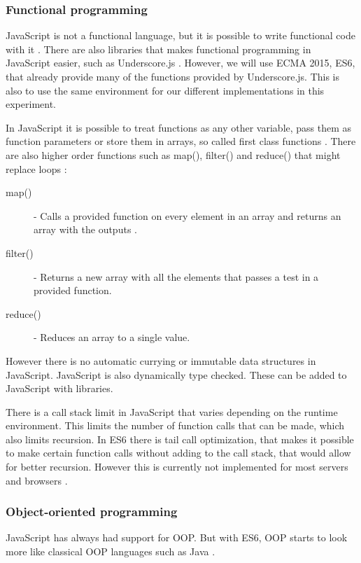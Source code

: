 \documentclass {article}
\begin{document}
\subsubsection{Functional programming}
\label{sec:js-fp}
JavaScript is not a functional language, but it is possible to write functional code with it \cite{drboolean}. There are also libraries that makes functional programming in JavaScript easier, such as Underscore.js \cite{underscorejs} \cite{fogus}. However, we will use ECMA 2015, ES6, that already provide many of the functions provided by Underscore.js. This is also to use the same environment for our different implementations in this experiment.

In JavaScript it is possible to treat functions as any other variable, pass them as function parameters or store them in arrays, so called first class functions \cite{drboolean}. There are also higher order functions such as map(), filter() and reduce() that might replace loops \cite{grady}:

\begin{description}
\item [map()] - Calls a provided function on every element in an array and returns an array with the outputs \cite{jsref}.
\item [filter()] - Returns a new array with all the elements that passes a test in a provided function. 
\item [reduce()] - Reduces an array to a single value.
\end{description}

However there is no automatic currying or immutable data structures in JavaScript. JavaScript is also dynamically type checked. These can be added to JavaScript with libraries.

There is a call stack limit in JavaScript that varies depending on the runtime environment. This limits the number of function calls that can be made, which also limits recursion. In ES6 there is tail call optimization, that makes it possible to make certain function calls without adding to the call stack, that would allow for better recursion. However this is currently not implemented for most servers and browsers \cite{ecma6table}.
\subsubsection{Object-oriented programming}
JavaScript has always had support for OOP. But 
with ES6, OOP starts to look more like classical OOP languages such as Java \cite{ecmacompare}.
\end{document}
